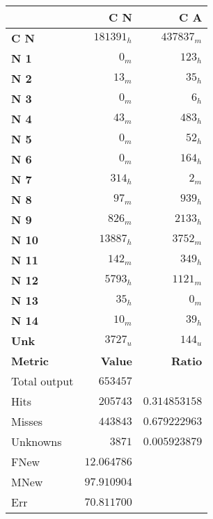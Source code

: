 \small
\begin{tabular}{ l| r| r }
                        & \textbf{C N}  & \textbf{C A}  \\
  \hline 
  \hline \textbf{C N}   & $181391 _h$  &  $437837 _m$ \\
  \hline \textbf{N 1}   & $0 _m$       &  $123 _h$    \\
  \hline \textbf{N 2}   & $13 _m$      &  $35 _h$     \\
  \hline \textbf{N 3}   & $0 _m$       &  $6 _h$      \\
  \hline \textbf{N 4}   & $43 _m$      &  $483 _h$    \\
  \hline \textbf{N 5}   & $0 _m$       &  $52 _h$     \\
  \hline \textbf{N 6}   & $0 _m$       &  $164 _h$    \\
  \hline \textbf{N 7}   & $314 _h$     &  $2 _m$      \\
  \hline \textbf{N 8}   & $97 _m$      &  $939 _h$    \\
  \hline \textbf{N 9}   & $826 _m$     &  $2133 _h$   \\
  \hline \textbf{N 10}  & $13887 _h$   &  $3752 _m$   \\
  \hline \textbf{N 11}  & $142 _m$     &  $349 _h$    \\
  \hline \textbf{N 12}  & $5793 _h$    &  $1121 _m$   \\
  \hline \textbf{N 13}  & $35 _h$      &  $0 _m$      \\
  \hline \textbf{N 14}  & $10 _m$      &  $39 _h$     \\
  \hline \textbf{Unk}   & $3727 _u$    &  $144 _u$    \\
  \hline
  \hline \textbf{Metric}  & \textbf{Value}  & \textbf{Ratio}   \\
  \hline Total output     & $653457$        &               \\
  \hline Hits             & $205743$        & $0.314853158$  \\
  \hline Misses           & $443843$        & $0.679222963$ \\
  \hline Unknowns         & $3871$          & $0.005923879$ \\
  \hline
  \hline FNew             & $12.064786$     & \\
  \hline MNew             & $97.910904$     & \\
  \hline Err              & $70.811700$     & \\
\end{tabular}
\normalsize

